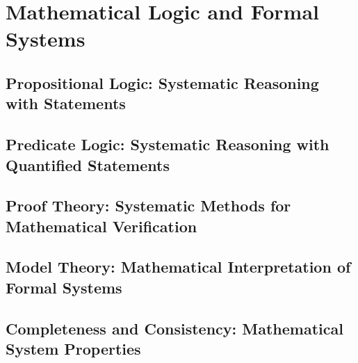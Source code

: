 

\chapter{Mathematical Logic and Formal Systems}

\section{Propositional Logic: Systematic Reasoning with Statements}

\section{Predicate Logic: Systematic Reasoning with Quantified Statements}

\section{Proof Theory: Systematic Methods for Mathematical Verification}

\section{Model Theory: Mathematical Interpretation of Formal Systems}

\section{Completeness and Consistency: Mathematical System Properties}
